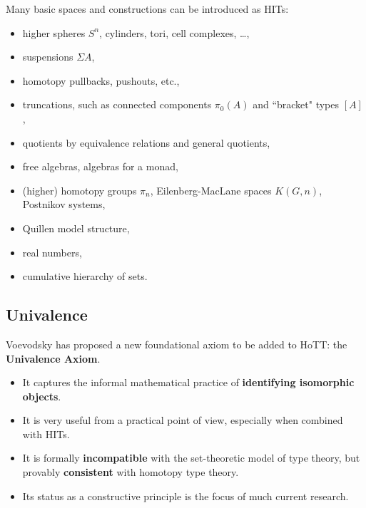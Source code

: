 \documentclass[11pt]{article}
\newcommand{\myemph}[1]{\textbf{#1}}    %
\begin{document}
Many basic spaces and constructions can be introduced as HITs:

\begin{itemize}
\item higher spheres $S^n$, cylinders, tori, cell complexes, \dots,
\item suspensions $\Sigma A$, 
\item homotopy pullbacks, pushouts, etc.,
\item truncations, such as connected components $\pi_0(A)$ and  ``bracket" types $[A]$,
\item quotients by equivalence relations and general quotients,  
\item free algebras, algebras for a monad, 
\item (higher) homotopy groups $\pi_n$, Eilenberg-MacLane spaces $K(G,n)$, Postnikov systems,
\item Quillen model structure,
\item real numbers,
\item cumulative hierarchy of sets.
\end{itemize}


\subsection*{Univalence}


%
%

Voevodsky has proposed a new foundational axiom to be added to HoTT: the \myemph{Univalence Axiom}.

\begin{itemize}
\item It captures the informal mathematical practice of \myemph{identifying isomorphic objects}.  

\item It is very useful from a practical point of view, especially when combined with HITs.

\item It is formally \myemph{incompatible} with the set-theoretic model of type theory, but provably \myemph{consistent} with homotopy type theory. 
 
\item  Its  status as a constructive principle is the focus of much current research.
\end{itemize}
\end{document}
